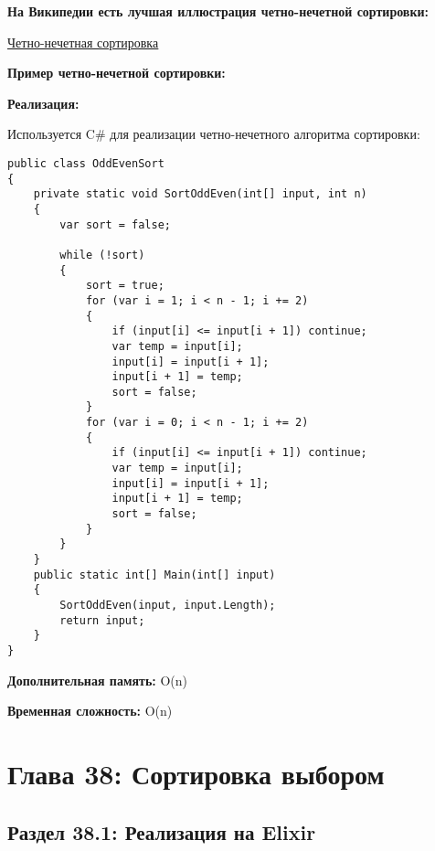 \vspace{\baselineskip}
\textbf{На Википедии есть лучшая иллюстрация четно-нечетной сортировки:}

\vspace{\baselineskip}
\href{https://i.stack.imgur.com/FVktW.gif}{\underline{Четно-нечетная сортировка}}

\vspace{\baselineskip}
\textbf{Пример четно-нечетной сортировки:}

\newpage

\vspace{\baselineskip}

\vspace{\baselineskip}
\textbf{Реализация:}

\vspace{\baselineskip}
Используется C\# для реализации четно-нечетного алгоритма сортировки:

\vspace{\baselineskip}
\begin{tcolorbox}
\begin{verbatim} 
public class OddEvenSort
{
	private static void SortOddEven(int[] input, int n)
	{
		var sort = false;
		
		while (!sort)
		{
			sort = true;
			for (var i = 1; i < n - 1; i += 2)
			{
				if (input[i] <= input[i + 1]) continue;
				var temp = input[i];
				input[i] = input[i + 1];
				input[i + 1] = temp;
				sort = false;
			}
			for (var i = 0; i < n - 1; i += 2)
			{
				if (input[i] <= input[i + 1]) continue;
				var temp = input[i];
				input[i] = input[i + 1];
				input[i + 1] = temp;
				sort = false;
			}
		}
	}
	public static int[] Main(int[] input)
	{
		SortOddEven(input, input.Length);
		return input;
	}
}
\end{verbatim}
\end{tcolorbox}


\vspace{\baselineskip}
\textbf{Дополнительная память:} O(n) 

\textbf{Временная сложность:} O(n) 

\chapter*{Глава 38: Сортировка выбором}
\section*{Раздел 38.1: Реализация на Elixir}

